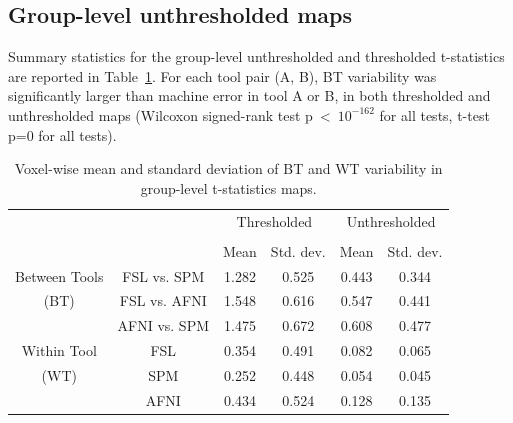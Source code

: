 \documentclass[conference]{IEEEtran}
\begin{document}
\subsection{Group-level unthresholded maps}

Summary statistics for the group-level unthresholded and thresholded
t-statistics are reported in Table~\ref{table:pipeline-stats}. For each
tool pair (A, B), BT variability was significantly larger than machine
error in tool A or B, in both thresholded and unthresholded maps (Wilcoxon
signed-rank test p~\textless~$10^{-162}$ for all tests, t-test p=0 for all
tests). 





\setlength{\tabcolsep}{5pt}
\begin{table}[h]
    \centering
    \begin{tabular}{cccc|cc}
        \toprule
        \multirow{2}{*}{}& {} & \multicolumn{2}{c}{Thresholded} & \multicolumn{2}{c}{Unthresholded} \\
        \cmidrule{3-4} \cmidrule{5-6} \\
        {} & {} & Mean & Std. dev. & Mean & Std. dev. \\
        \midrule
        \rowcolor{lightgray}
        {Between Tools} & FSL vs. SPM        &  1.282       & 0.525      & 0.443     & 0.344  \\
        \rowcolor{lightgray}
        {(BT)} & FSL vs. AFNI                &  1.548       & 0.616      & 0.547     & 0.441  \\
        \rowcolor{lightgray}
        {} & AFNI vs. SPM                    &  1.475       & 0.672      & 0.608     & 0.477  \\
        {Within Tool} & FSL                  &  0.354       & 0.491      & 0.082     & 0.065  \\
        {(WT)}   & SPM                       &  0.252       & 0.448      & 0.054     & 0.045  \\
        {}   & AFNI                          &  0.434       & 0.524      & 0.128     & 0.135  \\
        \bottomrule
    \end{tabular}
    \caption{Voxel-wise mean and standard deviation of BT and WT variability
    in group-level t-statistics maps.}
    \label{table:pipeline-stats}
\end{table}
\end{document}
